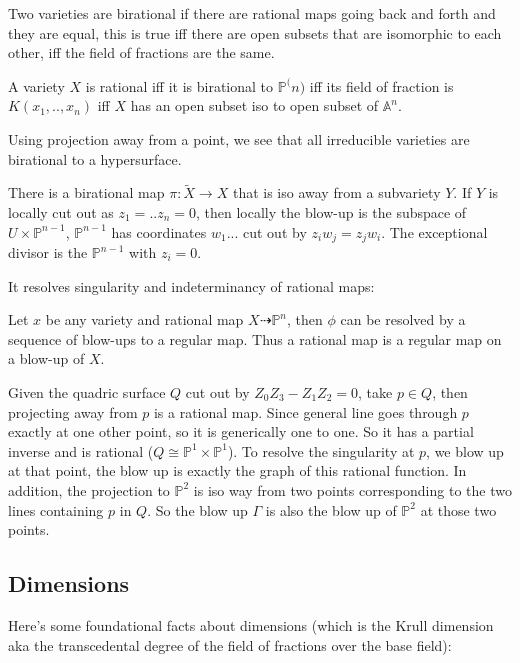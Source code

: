 \documentclass[main.tex]{subfiles}
\newcommand{\Pn}[1]{\mathbb{P}^{#1}}
\begin{document}
Two varieties are birational if there are rational maps going back and forth and they are equal, this is true iff there are open subsets that are isomorphic to each other, iff the field of fractions are the same.

A variety $X$ is rational iff it is birational to $\Pn(n)$ iff its field of fraction is $K(x_1, .., x_n)$ iff $X$ has an open subset iso to open subset of $\mathbb{A}^n$. 


\begin{remark}
Using projection away from a point, we see that all irreducible varieties are birational to a hypersurface.
\end{remark}

There is a birational map $\pi: \tilde{X} \rightarrow X$ that is iso away from a subvariety $Y$. If $Y$ is locally cut out as $z_1 = .. z_n = 0$, then locally the blow-up is the subspace of $U \times \Pn{n-1}$, $\Pn{n-1}$ has coordinates $w_1...$ cut out by $z_i w_j = z_j w_i$. The exceptional divisor is the $\Pn{n-1}$ with $z_i = 0$. 

It resolves singularity and indeterminancy of rational maps:
\begin{theorem}
Let $x$ be any variety and rational map $X \dashrightarrow \Pn{n}$, then $\phi$ can be resolved by a sequence of blow-ups to a regular map. Thus a rational map is a regular map on a blow-up of $X$. 
\end{theorem}

\begin{example}
Given the quadric surface $Q$ cut out by $Z_0 Z_3 - Z_1 Z_2 = 0$, take $p \in Q$, then projecting away from $p$ is a rational map. Since general line goes through $p$ exactly at one other point, so it is generically one to one. So it has a partial inverse and is rational ($Q \cong \Pn{1} \times \Pn{1}$). To resolve the singularity at $p$, we blow up at that point, the blow up is exactly the graph of this rational function. In addition, the projection to $\Pn{2}$ is iso way from two points corresponding to the two lines containing $p$ in $Q$. So the blow up $\Gamma$ is also the blow up of $\Pn{2}$ at those two points.
\end{example}

\subsection{Dimensions}
Here's some foundational facts about dimensions (which is the Krull dimension aka the transcedental degree of the field of fractions over the base field):
\end{document}
